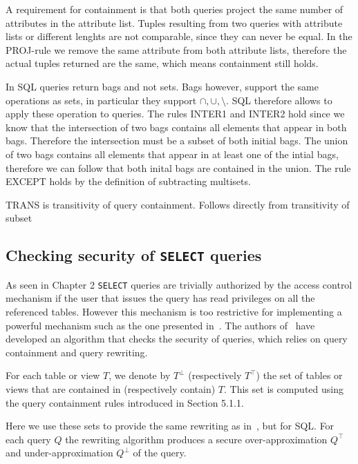 A requirement for containment is that both queries project the same number of attributes in the attribute list. 
%
Tuples resulting from two queries with attribute lists or different lenghts are not comparable, since they can never be equal.
%
In the PROJ-rule we remove the same attribute from both attribute lists, therefore the actual tuples returned are the same, which means containment still holds.

In SQL queries return bags and not sets.
%
Bags however, support the same operations as sets, in particular they support $\cap, \cup, \setminus$.
%
SQL therefore allows to apply these operation to queries.
%
The rules INTER1 and INTER2 hold since we know that the intersection of two bags contains all elements that appear in both bags.
%
Therefore the intersection must be a subset of both initial bags.
%
The union of two bags contains all elements that appear in at least one of the intial bags, therefore we can follow that both inital bags are contained in the union.
%
The rule EXCEPT holds by the definition of subtracting multisets.

TRANS is transitivity of query containment. Follows directly from transitivity of subset

\FloatBarrier
\subsection{Checking security of \texttt{SELECT} queries}

As seen in Chapter 2 \texttt{SELECT} queries are trivially authorized by the access control mechanism if the user that issues the query has read privileges on all the referenced tables.
%
However this mechanism is too restrictive for implementing a powerful mechanism such as the one presented in~\cite{guarnieri2016strong}.
%
The authors of~\cite{guarnieri2016strong} have developed an algorithm that checks the security of queries, which relies on query containment and query rewriting. 

For each table or view $T$, we denote by $T^\bot$ (respectively $T^\top$) the set of tables or views that are contained in (respectively contain) $T$.
%
This set is computed using the query containment rules introduced in Section 5.1.1.
%

Here we use these sets to provide the same rewriting as in~\cite{guarnieri2016strong}, but for SQL.
%
For each query $Q$ the rewriting algorithm produces a secure over-approximation $Q^\top$ and under-approximation $Q^\bot$ of the query.

